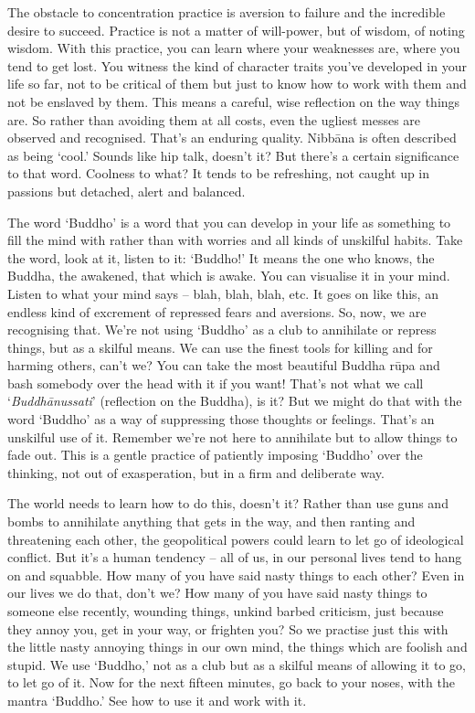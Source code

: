 The obstacle to concentration practice is aversion to failure and the incredible desire to succeed. Practice is not a matter of will-power, but of wisdom, of noting wisdom. With this practice, you can learn where your weaknesses are, where you tend to get lost. You witness the kind of character traits you've developed in your life so far, not to be critical of them but just to know how to work with them and not be enslaved by them. This means a careful, wise reflection on the way things are. So rather than avoiding them at all costs, even the ugliest messes are observed and recognised. That's an enduring quality. Nibbāna is often described as being `cool.' Sounds like hip talk, doesn't it? But there's a certain significance to that word. Coolness to what? It tends to be refreshing, not caught up in passions but detached, alert and balanced.

The word `Buddho' is a word that you can develop in your life as something to fill the mind with rather than with worries and all kinds of unskilful habits. Take the word, look at it, listen to it: `Buddho!' It means the one who knows, the Buddha, the awakened, that which is awake. You can visualise it in your mind. Listen to what your mind says -- blah, blah, blah, etc. It goes on like this, an endless kind of excrement of repressed fears and aversions. So, now, we are recognising that. We're not using `Buddho' as a club to annihilate or repress things, but as a skilful means. We can use the finest tools for killing and for harming others, can't we? You can take the most beautiful Buddha rūpa and bash somebody over the head with it if you want! That's not what we call `\textit{Buddhānussati}' (reflection on the Buddha), is it? But we might do that with the word `Buddho' as a way of suppressing those thoughts or feelings. That's an unskilful use of it. Remember we're not here to annihilate but to allow things to fade out. This is a gentle practice of patiently imposing `Buddho' over the thinking, not out of exasperation, but in a firm and deliberate way.

The world needs to learn how to do this, doesn't it? Rather than use guns and bombs to annihilate anything that gets in the way, and then ranting and threatening each other, the geopolitical powers could learn to let go of ideological conflict. But it's a human tendency – all of us, in our personal lives tend to hang on and squabble. How many of you have said nasty things to each other? Even in our lives we do that, don't we? How many of you have said nasty things to someone else recently, wounding things, unkind barbed criticism, just because they annoy you, get in your way, or frighten you? So we practise just this with the little nasty annoying things in our own mind, the things which are foolish and stupid. We use `Buddho,' not as a club but as a skilful means of allowing it to go, to let go of it. Now for the next fifteen minutes, go back to your noses, with the mantra `Buddho.' See how to use it and work with it.

